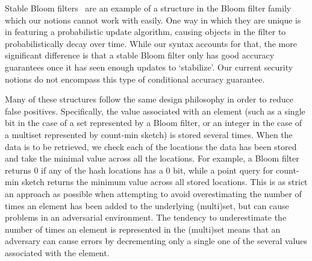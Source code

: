 

Stable Bloom filters~\cite{xxx} are an example of a structure in the Bloom filter family which our notions cannot work with easily. One way in which they are unique is in featuring a probabilistic update algorithm, causing objects in the filter to probabilistically decay over time. While our syntax accounts for that, the more significant difference is that a stable Bloom filter only has good accuracy guarantees once it has seen enough updates to `stabilize'. Our current security notions do not encompass this type of conditional accuracy guarantee. 

Many of these structures follow the same design philosophy in order to reduce false positives. Specifically, the value associated with an element (such as a single bit in the case of a set represented by a Bloom filter, or an integer in the case of a multiset represented by count-min sketch) is stored several times. When the data is to be retrieved, we check each of the locations the data has been stored and take the minimal value across all the locations. For example, a Bloom filter returns 0 if any of the hash locations has a 0 bit, while a point query for count-min sketch returns the minimum value across all stored locations. This is as strict an approach as possible when attempting to avoid overestimating the number of times an element has been added to the underlying (multi)set, but can cause problems in an adversarial environment. The tendency to underestimate the number of times an element is represented in the (multi)set means that an adversary can cause errors by decrementing only a single one of the several values associated with the element.

